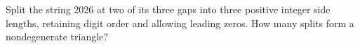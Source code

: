 Split the string 2026 at two of its three gaps into three positive integer side lengths, retaining digit order and allowing leading zeros. How many splits form a nondegenerate triangle?
